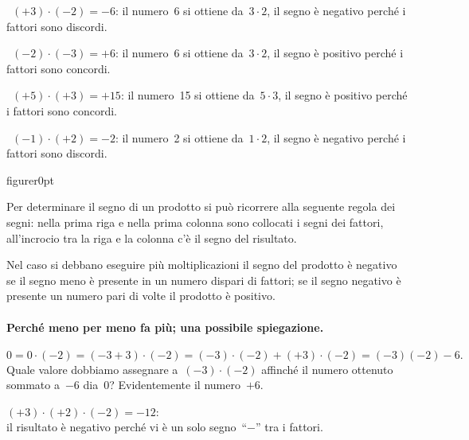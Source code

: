  \begin{esempio}
~\((+3)\cdot(-2)=-6\): il numero~6 si ottiene da~\(3\cdot2\), il segno è 
negativo 
perché i fattori sono discordi.
 \end{esempio}

 \begin{esempio}
~\((-2)\cdot(-3)=+6\): il numero~6 si ottiene da~\(3\cdot2\), il segno è 
positivo 
perché i fattori sono concordi.
 \end{esempio}
 \begin{esempio}
~\((+5)\cdot(+3)=+15\): il numero~15 si ottiene da~\(5\cdot3\), il segno è 
positivo 
perché i fattori sono concordi.
 \end{esempio}
 \begin{esempio}
~\((-1)\cdot(+2)=-2\): il numero~2 si ottiene da~\(1\cdot2\), il segno è 
negativo 
perché i fattori sono discordi.
 \end{esempio}


\begin{wrapfloat}{figure}{r}{0pt}

\end{wrapfloat}
Per determinare il segno di un prodotto si può ricorrere alla seguente 
regola 
dei segni: nella prima riga e
nella prima colonna sono collocati i segni dei fattori, all'incrocio tra la 
riga 
e la colonna c'è il segno
del risultato.

Nel caso si debbano eseguire più moltiplicazioni il segno del prodotto è 
negativo se il segno meno è presente
in un numero dispari di fattori; se il segno negativo è presente un numero 
pari 
di volte il prodotto è positivo.

\paragraph{Perché meno per meno fa più; una possibile spiegazione.}
\[0=0\cdot (-2) = (-3+3)\cdot (-2) = 
(-3)\cdot(-2)+(+3)\cdot(-2)=(-3)(-2)-6.\]
Quale valore dobbiamo assegnare a~\((-3)\cdot(-2)\) affinché il numero 
ottenuto 
sommato a~\(-6\) dia~0?
Evidentemente il numero~\(+6\).

 \begin{esempio}
\((+3)\cdot (+2)\cdot (-2) =-12\): \\
il risultato è negativo perché vi è un solo segno~``\(-\)'' tra i fattori.
 \end{esempio}

